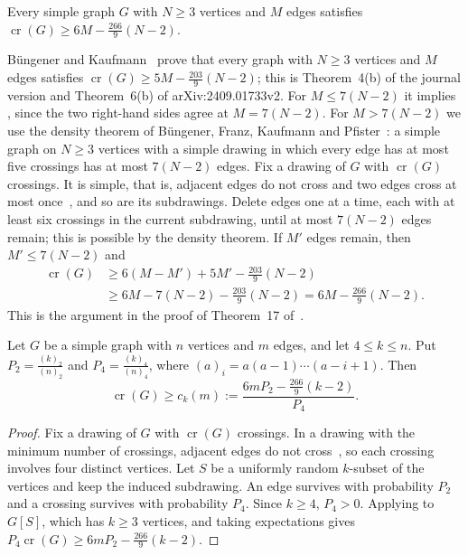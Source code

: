 \documentclass[11pt,colorlinks]{charlie}
\newcommand{\cro}{\operatorname{cr}}
\begin{document}
\begin{theorem}\label{thm:BFKP}
Every simple graph $G$ with $N\ge3$ vertices and $M$ edges satisfies $\cro(G)\ge6M-\tfrac{266}{9}(N-2)$.
\end{theorem}

Büngener and Kaufmann~\cite{BK} prove that every graph with $N\ge3$ vertices and $M$ edges satisfies $\cro(G)\ge5M-\tfrac{203}{9}(N-2)$; this is Theorem~4(b) of the journal version and Theorem~6(b) of arXiv:2409.01733v2. For $M\le7(N-2)$ it implies , since the two right-hand sides agree at $M=7(N-2)$. For $M>7(N-2)$ we use the density theorem of Büngener, Franz, Kaufmann and Pfister~\cite[Theorem~7]{BFKP}: a simple graph on $N\ge3$ vertices with a simple drawing in which every edge has at most five crossings has at most $7(N-2)$ edges. Fix a drawing of $G$ with $\cro(G)$ crossings. It is simple, that is, adjacent edges do not cross and two edges cross at most once~\cite{Schaefer}, and so are its subdrawings. Delete edges one at a time, each with at least six crossings in the current subdrawing, until at most $7(N-2)$ edges remain; this is possible by the density theorem. If $M'$ edges remain, then $M'\le7(N-2)$ and
\begin{align*}
 \cro(G)&\ge6(M-M')+5M'-\tfrac{203}{9}(N-2)\\
 &\ge6M-7(N-2)-\tfrac{203}9(N-2)=6M-\tfrac{266}{9}(N-2).
\end{align*}
This is the argument in the proof of Theorem~17 of~\cite{BFKP}.

\begin{lemma}[Sampling]\label{lem:sampling}
Let $G$ be a simple graph with $n$ vertices and $m$ edges, and let $4\le k\le n$. Put $P_2=\frac{(k)_2}{(n)_2}$ and $P_4=\frac{(k)_4}{(n)_4}$, where $(a)_i=a(a-1)\cdots(a-i+1)$. Then
\[
 \cro(G)\ge c_k(m):=\frac{6mP_2-\tfrac{266}{9}(k-2)}{P_4}.
\]
\end{lemma}

\begin{proof}
Fix a drawing of $G$ with $\cro(G)$ crossings. In a drawing with the minimum number of crossings, adjacent edges do not cross~\cite{Schaefer}, so each crossing involves four distinct vertices. Let $S$ be a uniformly random $k$-subset of the vertices and keep the induced subdrawing. An edge survives with probability $P_2$ and a crossing survives with probability $P_4$. Since $k\ge4$, $P_4>0$. Applying  to $G[S]$, which has $k\ge3$ vertices, and taking expectations gives $P_4\cro(G)\ge6mP_2-\tfrac{266}{9}(k-2)$.
\end{proof}
\end{document}
